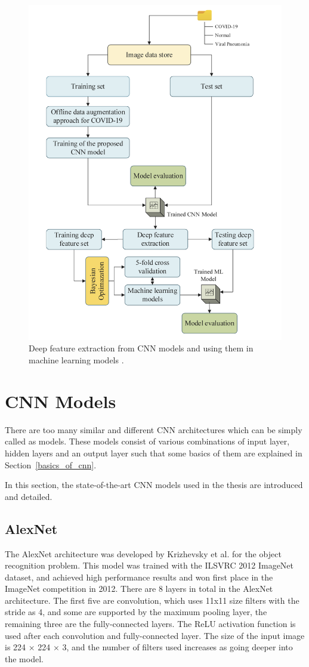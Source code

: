 \begin{figure}[h]
    \centering
    \includegraphics[width=.8\linewidth]{fig/deepfeauter_usage.png}
    \caption{Deep feature extraction from CNN models and using them in machine learning models \cite{A_novelCNNModel}.}
    \label{fig:A_novelCNNModel_architecture}
\end{figure}

\section{CNN Models}

There are too many similar and different CNN architectures which can be simply called as models. These models consist of various combinations of input layer, hidden layers and an output layer such that some basics of them are explained in Section~\ref{basics_of_cnn}.

In this section, the state-of-the-art CNN models used in the thesis are introduced and detailed.

\subsection{AlexNet}

The AlexNet architecture was developed by Krizhevsky et al. \cite{AlexNet} for the object recognition problem. This model was trained with the ILSVRC 2012 ImageNet \cite{imagenet} dataset, and achieved high performance results and won first place in the ImageNet competition in 2012. There are 8 layers in total in the AlexNet architecture. The first five are convolution, which uses 11x11 size filters with the stride as 4, and some are supported by the maximum pooling layer, the remaining three are the fully-connected layers. The ReLU activation function is used after each convolution and fully-connected layer. The size of the input image is 224 × 224 × 3, and the number of filters used increases as going deeper into the model.

